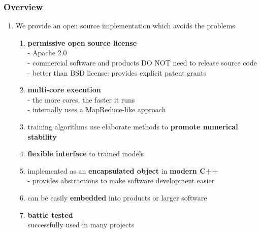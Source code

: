 \documentclass[usenames,dvipsnames]{beamer}
\begin{document}
\begin{frame}
\frametitle{Overview}

\begin{enumerate}[{~~$\boldsymbol{\bullet}$}]

\item We provide an open source implementation which avoids the problems

\begin{enumerate}[{$\boldsymbol{\rightarrow}$}]
\renewcommand{\itemsep}{1ex}
\item 
{\bf permissive open source license}\\
- Apache 2.0\\
- commercial software and products DO NOT need to release source code\\
- better than BSD license: provides explicit patent grants

\item
{\bf multi-core execution}\\
- the more cores, the faster it runs\\
- internally uses a MapReduce-like approach

\item
training algorithms use elaborate methods to {\bf promote numerical stability}

\item
{\bf flexible interface} to trained models

\item
implemented as an {\bf encapsulated object} in {\bf modern C++}\\
- provides abstractions to make software development easier

\item
can be easily {\bf embedded} into products or larger software\\

\item
{\bf battle tested}\\
successfully used in many projects

\end{enumerate}

\end{enumerate}
\end{frame}

%
%
%
\end{document}
